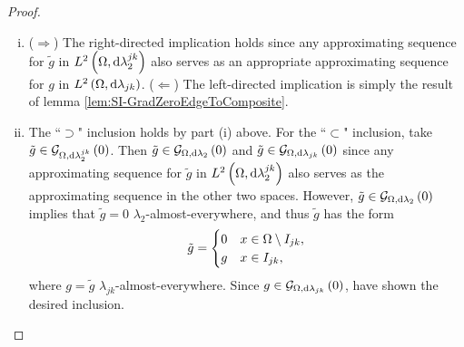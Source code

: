 \begin{proof}
	\begin{enumerate}[(i)]
		\item ($\Rightarrow$) The right-directed implication holds since any approximating sequence for $\tilde{g}$ in $L^{2}\left( \Omega,\mathrm{d} \lambda_2^{jk} \right)$ also serves as an appropriate approximating sequence for $g$ in $L^{2}\left( \Omega,\mathrm{d} \lambda_{jk} \right)$. \newline
		($\Leftarrow$) The left-directed implication is simply the result of lemma \ref{lem:SI-GradZeroEdgeToComposite}.
		\item The ``$\supset$" inclusion holds by part (i) above.
		For the ``$\subset$" inclusion, take $\tilde{g}\in\mathcal{G}_{ \Omega, \mathrm{d}\lambda_2^{jk}}\left( 0 \right)$.
		Then $\tilde{g}\in\mathcal{G}_{ \Omega, \mathrm{d}\lambda_2}\left( 0 \right)$ and $\tilde{g}\in\mathcal{G}_{ \Omega, \mathrm{d}\lambda_{jk}}\left( 0 \right)$ since any approximating sequence for $\tilde{g}$ in $L^{2}\left( \Omega,\mathrm{d} \lambda_2^{jk} \right)$ also serves as the approximating sequence in the other two spaces.
		However, $\tilde{g}\in\mathcal{G}_{ \Omega, \mathrm{d}\lambda_2}\left( 0 \right)$ implies that $\tilde{g}=0$ $\lambda_2$-almost-everywhere,	and thus $\tilde{g}$ has the form
		\begin{align*}
			\tilde{g} = \begin{cases} 0 & x\in\Omega\setminus I_{jk}, \\ g & x\in I_{jk}, \end{cases}
		\end{align*}
		where $g = \tilde{g}$ $\lambda_{jk}$-almost-everywhere.
		Since $g\in\mathcal{G}_{ \Omega, \mathrm{d}\lambda_{jk}}\left( 0 \right)$, have shown the desired inclusion.
	\end{enumerate}
\end{proof}

